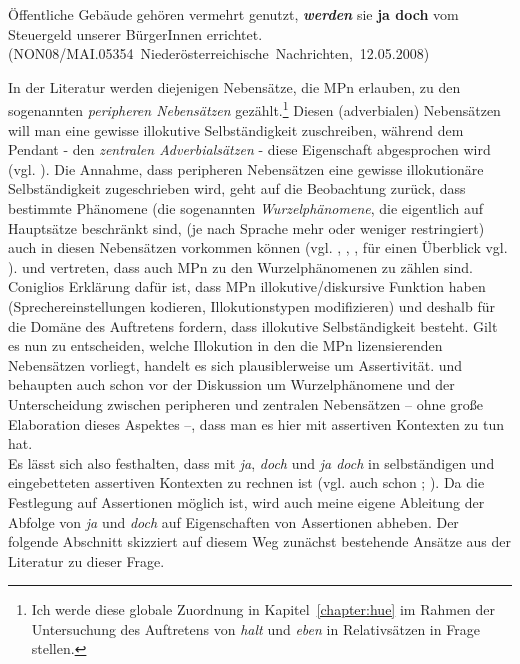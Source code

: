 \begin{exe}
	\ex\label{375} 
	\scriptsize
	Öffentliche Gebäude gehören vermehrt genutzt, \textbf{\textit{werden}} sie \textbf{ja doch} vom Steuergeld unserer Bür\-gerInnen errichtet. 	
	\hfill\hbox {(NON08/MAI.05354 Niederösterreichische Nachrichten, 12.05.2008)}
\end{exe}
In der Literatur werden diejenigen Nebensätze, die MPn erlauben, zu den sogenannten \textit{peripheren Nebensätzen}  gezählt.\footnote{Ich werde diese globale Zuordnung in Kapitel~\ref{chapter:hue} im Rahmen der Untersuchung des Auftretens von \textit{halt} und \textit{eben} in Relativsätzen in Frage stellen.} Diesen (adverbialen) Nebensätzen will man eine gewisse illokutive Selbständigkeit zuschreiben, während dem \glq Pendant\grq {} - den \textit{zentralen Adverbialsätzen}  - diese Eigenschaft abgesprochen wird (vgl. \citealt{Haegeman2002, Haegeman2004, Haegeman2006}). Die Annahme, dass peripheren Nebensätzen eine gewisse illokutionäre Selbständigkeit zugeschrieben wird, geht auf die Beobachtung zurück, dass bestimmte Phänomene (die sogenannten  \textit{Wurzelphänomene}, die eigentlich auf Hauptsätze beschränkt sind, (je nach Sprache mehr oder weniger restringiert) auch in diesen Nebensätzen vorkommen können (vgl. \citealt{Emonds1969}, \citealt{Rutherford1970}, \citealt{Hooper1973}, für einen Überblick vgl. \citealt{Heycock2005}). \citet{Coniglio2011} und \citet{Abraham2012} vertreten, dass auch MPn zu den Wurzelphänomenen zu zählen sind. Coniglios Erklärung dafür ist, dass MPn illokutive/diskursive Funktion haben (Sprechereinstellungen kodieren, Illokuti\-onstypen modifizieren) und deshalb für die Domäne des Auftretens fordern, dass illokutive Selbständigkeit besteht. Gilt es nun zu entscheiden, welche Illokution in den die MPn lizensierenden Nebensätzen vorliegt, handelt es sich plausiblerweise um Assertivität. \citet[120]{Doherty1987} und \citet[93]{Kwon2005} behaupten auch schon vor der Diskussion um Wurzelphänomene und der Unterscheidung zwi\-schen peripheren und zentralen Nebensätzen -- ohne große Elaboration dieses Aspektes --, dass man es hier mit assertiven Kontexten zu tun hat.\\

\noindent
Es lässt sich also festhalten, dass mit \textit{ja}, \textit{doch} und \textit{ja doch} in selbständigen und eingebetteten assertiven Kontexten zu rechnen ist (vgl. auch schon \citealt[167-170]{Mueller2014a}; \citeyear[205-207]{Mueller2017b}). Da die Festlegung auf Assertionen möglich ist, wird auch meine eigene Ableitung der Abfolge von \textit{ja} und \textit{doch} auf Eigenschaften von Assertionen abheben. Der folgende Abschnitt skizziert auf diesem Weg zunächst bestehende Ansätze aus der Literatur zu dieser Frage. 

